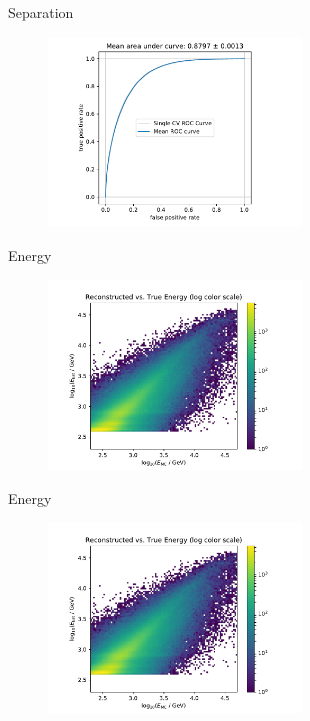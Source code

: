 \begin{frame}[t]{Separation}
    \begin{figure}
        \centering
        \includegraphics[width=0.6\textwidth,page=4]{fig/separation_performance.pdf}
    \end{figure}
\end{frame}

\begin{frame}[t]{Energy}
    \begin{figure}
        \centering
        \includegraphics[width=0.6\textwidth,page=3]{fig/energy-performance.pdf}
    \end{figure}
\end{frame}

\begin{frame}[t]{Energy}
    \begin{figure}
        \centering
        \includegraphics[width=0.6\textwidth,page=4]{fig/energy-performance.pdf}
    \end{figure}
\end{frame}

